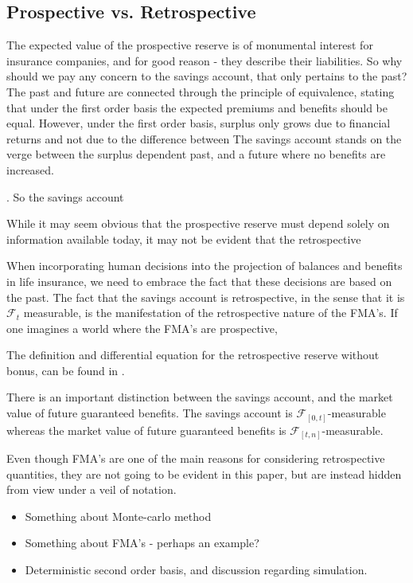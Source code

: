 \documentclass[12pt]{article}
\theoremstyle{my_thm}
\begin{document}
\iffalse
\subsection{Prospective vs. Retrospective}
The expected value of the prospective reserve is of monumental interest for insurance companies, and for good reason - they describe their liabilities. So why should we pay any concern to the savings account, that only pertains to the past? The past and future are connected through the principle of equivalence, stating that under the first order basis the expected premiums and benefits should be equal. However, under the first order basis, surplus only grows due to financial returns and not due to the difference between
The savings account stands on the verge between the surplus dependent past, and a future where no benefits are increased.


. So the savings account 

While it may seem obvious that the prospective reserve must depend solely on information available today, it may not be evident that the retrospective

When incorporating human decisions into the projection of balances and benefits in life insurance, we need to embrace the fact that these decisions are based on the past. The fact that the savings account is retrospective, in the sense that it is $\mathcal{F}_t$ measurable, is the manifestation of the retrospective nature of the FMA's. If one imagines a world where the FMA's are prospective, 

The definition and differential equation for the retrospective reserve without bonus, can be found in \citet{Norberg}. 

There is an important distinction between the savings account, and the market value of future guaranteed benefits. The savings account is $\mathcal{F}_{[0,t]}$-measurable whereas the market value of future guaranteed benefits is $\mathcal{F}_{[t,n]}$-measurable.

 Even though FMA's are one of the main reasons for considering retrospective quantities, they are not going to be evident in this paper, but are instead hidden from view under a veil of notation. 

\begin{itemize}
\item Something about Monte-carlo method
\item Something about FMA's - perhaps an example?
\item Deterministic second order basis, and discussion regarding simulation.
\end{itemize}
\end{document}
